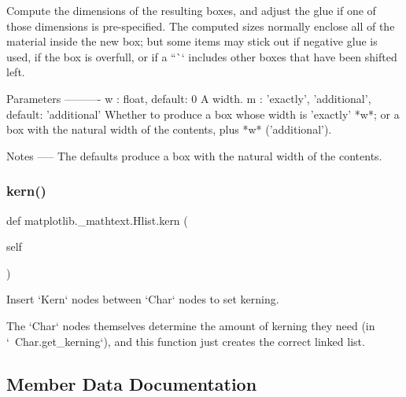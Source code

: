 \begin{DoxyVerb}Compute the dimensions of the resulting boxes, and adjust the glue if
one of those dimensions is pre-specified.  The computed sizes normally
enclose all of the material inside the new box; but some items may
stick out if negative glue is used, if the box is overfull, or if a
``\vbox`` includes other boxes that have been shifted left.

Parameters
----------
w : float, default: 0
    A width.
m : {'exactly', 'additional'}, default: 'additional'
    Whether to produce a box whose width is 'exactly' *w*; or a box
    with the natural width of the contents, plus *w* ('additional').

Notes
-----
The defaults produce a box with the natural width of the contents.
\end{DoxyVerb}
 \mbox{\label{classmatplotlib_1_1__mathtext_1_1Hlist_aa838918fbf306f588ba975a06bbb44b3}} 
\subsubsection{\texorpdfstring{kern()}{kern()}}
{\footnotesize\ttfamily def matplotlib.\+\_\+mathtext.\+Hlist.\+kern (\begin{DoxyParamCaption}\item[{}]{self }\end{DoxyParamCaption})}

\begin{DoxyVerb}Insert `Kern` nodes between `Char` nodes to set kerning.

The `Char` nodes themselves determine the amount of kerning they need
(in `~Char.get_kerning`), and this function just creates the correct
linked list.
\end{DoxyVerb}
 

\subsection{Member Data Documentation}
\mbox{\label{classmatplotlib_1_1__mathtext_1_1Hlist_ae2d53be50f7aeb8a5e5764316b0caa2f}} 
